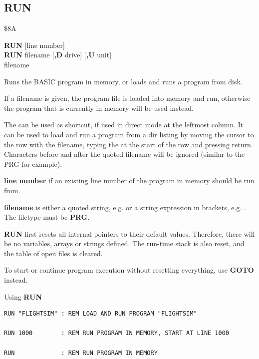 
\newpage
\subsection{RUN}
\begin{description}[leftmargin=2cm,style=nextline]
\item [Token:]    \$8A

\item [Format:]   {\bf RUN} [line number] \\
                  {\bf RUN} filename [{\bf,D} drive] [{\bf,U} unit] \\
                  \megakeywhite{$\uparrow$} filename

\item [Usage:]    Runs the BASIC program in memory, or loads and runs a program from disk.

                  If a filename is given, the program file is loaded into memory and run, otherwise the program that is currently in memory will be used instead.

                  The {\bf \screentext{$\uparrow$}} can be used as shortcut, if used in direct mode at the leftmost column. It can be used to load and run a program from a dir listing by moving the cursor to the row with the filename, typing the {\bf \screentext{$\uparrow$}} at the start of the row and pressing return. Characters before and after the quoted filename will be ignored (similar to the PRG for example).

                  {\bf line number} if an existing line number of the program in memory should be run from.

                  {\bf filename} is either a quoted string, e.g.  or a string expression in brackets, e.g. . The filetype must be {\bf PRG}.

                  \drivedefinition

                  \unitdefinition
                  
\item [Remarks:]  {\bf RUN} first resets all internal pointers to their default values. Therefore, there will be no variables, arrays or strings defined. The run-time stack is also reset, and the table of open files is cleared.

                  To start or continue program execution without resetting everything, use {\bf GOTO} instead.

\item [Examples:] Using {\bf RUN}

\begin{tcolorbox}[colback=black,coltext=white]
\verbatimfont{\codefont}
\begin{verbatim}
RUN "FLIGHTSIM" : REM LOAD AND RUN PROGRAM "FLIGHTSIM"

RUN 1000        : REM RUN PROGRAM IN MEMORY, START AT LINE 1000

RUN             : REM RUN PROGRAM IN MEMORY
\end{verbatim}
\end{tcolorbox}
\end{description}

